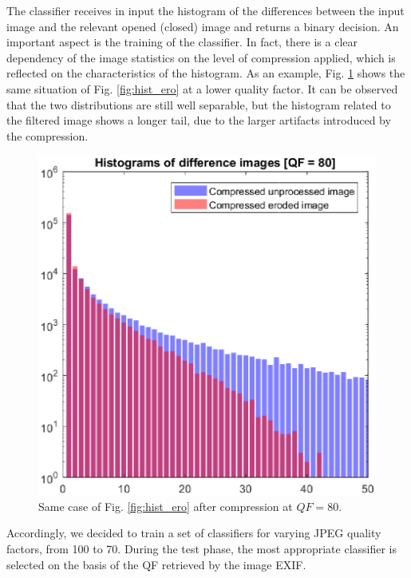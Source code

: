 \documentclass[review]{elsarticle}
\begin{document}
The classifier receives in input the histogram of the differences between the input image and the relevant opened (closed) image and returns a binary decision. An important aspect is the training of the classifier. In fact, there is a clear dependency of the image statistics on the level of compression applied, which is reflected on the characteristics of the histogram. As an example, Fig. \ref{fig:hist_ero_80} shows the same situation of Fig. \ref{fig:hist_ero} at a lower quality factor. It can be observed that the two distributions are still well separable, but the histogram related to the filtered image shows a longer tail, due to the larger artifacts introduced by the compression.

\begin{figure}[!h]%
	\centering
	\includegraphics[scale=0.55]{hist_ero_80.eps}
	\caption{Same case of Fig. \ref{fig:hist_ero} after compression at $QF = 80$.}
	\label{fig:hist_ero_80}%
\end{figure}

Accordingly, we decided to train a set of classifiers for varying JPEG quality factors, from 100 to 70. During the test phase, the most appropriate classifier is selected on the basis of the QF retrieved by the image EXIF.
\end{document}

